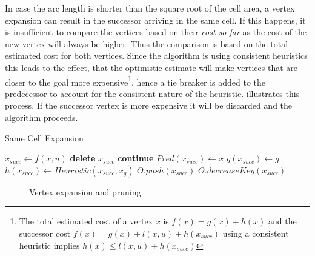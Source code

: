 In case the arc length is shorter than the square root of the cell area, a vertex expansion can result in the successor arriving in the same cell. 
If this happens, it is insufficient to compare the vertices based on their \textit{cost-so-far} as the cost of the new vertex will always be higher. Thus the comparison is based on the total estimated cost for both vertices. Since the algorithm is using consistent heuristics this leads to the effect, that the optimistic estimate will make vertices that are closer to the goal more expensive\footnote{The total estimated cost of a vertex $x$ is $f(x) = g(x)+h(x)$ and the successor cost $f(x) = g(x) + l(x,u)  + h(x_{succ}) $ using a consistent heuristic implies $ h(x) \leq  l(x,u)  + h(x_{succ})$}, hence a tie breaker is added to the predecessor to account for the consistent nature of the heuristic. illustrates this process. If the successor vertex is more expensive it will be discarded and the algorithm proceeds.

\begin{algorithm}
\caption{Same Cell Expansion}\label{alg:sameCellExpansion}
    \begin{algorithmic}[1]
                \State $x_{succ} \gets f(x,u)$
		                        \State \textbf{delete} $x_{succ}$
                        		 \State \textbf{continue}
        	                \EndIf            
            	                \State $Pred(x_{succ}) \gets x$
                	            \State $g(x_{succ}) \gets g$
                    	        \State $h(x_{succ}) \gets Heuristic(x_{succ}, x_g)$
                            	    \State $O.push(x_{succ})$
                           		\Else
                                	\State $O.decreaseKey(x_{succ})$
                        \EndIf
                        \EndIf
                    \EndIf
                \EndFor
    \end{algorithmic}
\end{algorithm}

\begin{figure}[h]
    \caption{Vertex expansion and pruning}
    \label{fig:expansionPruning}
\end{figure}

